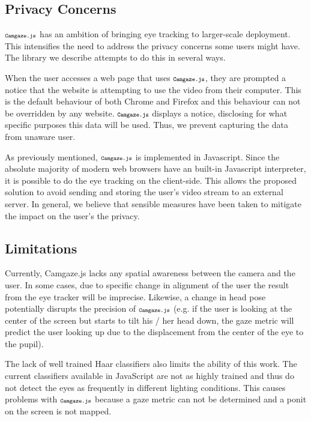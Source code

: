 \documentclass[annual]{acmsiggraph}
\newcommand{\Acronym}[1]{\ensuremath{{\small{\texttt{#1}}}}}
\newcommand{\Name}{\Acronym{Camgaze.js}} \newcommand{\False}{\Constant{false}}
\newcommand{\Constant}[1]{\ensuremath{\small{\texttt{#1}}}}
\begin{document}
\subsection{Privacy Concerns}

$\Name$ has an ambition of bringing eye tracking to larger-scale deployment.
This intensifies the need to address the privacy concerns some users might
have. The library we describe attempts to do this in several ways.

When the user accesses a web page that uses $\Name$, they are prompted a
notice that the website is attempting to use the video from their computer.
This is the default behaviour of both Chrome and Firefox and this behaviour can
not be overridden by any website. $\Name$ displays a notice, disclosing for
what specific purposes this data will be used. Thus, we prevent capturing the
data from unaware user.

As previously mentioned, $\Name$ is implemented in Javascript. Since the
absolute majority of modern web browsers have an built-in Javascript
interpreter, it is possible to do the eye tracking on the client-side. This
allows the proposed solution to avoid sending and storing the user’s video
stream to an external server. In general, we believe that sensible measures
have been taken to mitigate the impact on the user’s the privacy.

\subsection{Limitations}

Currently, Camgaze.js lacks any spatial awareness between the camera and the
user. In some cases, due to specific change in alignment of the user the result
from the eye tracker will be imprecise. Likewise, a change in head pose
potentially disrupts the precision of $\Name$ (e.g. if the user is looking at
the center of the screen but starts to tilt his / her head down, the gaze
metric will predict the user looking up due to the displacement from the center
of the eye to the pupil).

The lack of well trained Haar classifiers also limits the ability of this work.
The current classifiers available in JavaScript are not as highly trained and
thus do not detect the eyes as frequently in different lighting conditions.
This causes problems with $\Name$ because a gaze metric can not be determined
and a ponit on the screen is not mapped.

\end{document}
